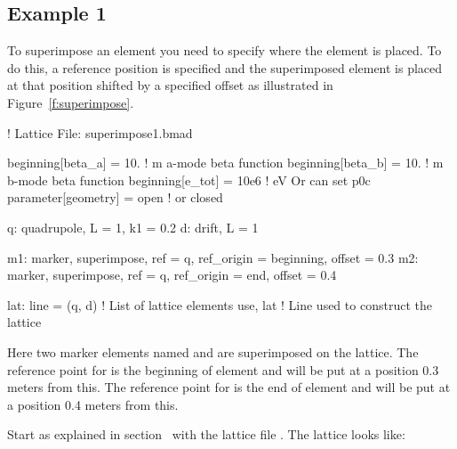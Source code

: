 \documentclass{hitec}
\begin{document}
\subsection{Example 1}

To superimpose an element you need to specify where the element is placed. To do this, a reference
position is specified and the superimposed element is placed at that position shifted by a specified
offset as illustrated in Figure~\ref{f:superimpose}.

\begin{code}
! Lattice File: superimpose1.bmad

beginning[beta_a] = 10.   ! m  a-mode beta function
beginning[beta_b] = 10.   ! m  b-mode beta function
beginning[e_tot] = 10e6   ! eV   Or can set p0c
parameter[geometry] = open      ! or closed

q: quadrupole, L = 1, k1 = 0.2
d: drift, L = 1

m1: marker, superimpose, ref = q, ref_origin = beginning, offset = 0.3
m2: marker, superimpose, ref = q, ref_origin = end, offset = 0.4

lat: line = (q, d)   ! List of lattice elements
use, lat             ! Line used to construct the lattice
\end{code}

Here two marker elements named  and  are superimposed on the lattice. The reference
point for  is the beginning of element  and  will be put at a position 0.3
meters from this.  The reference point for  is the end of element  and  will be
put at a position 0.4 meters from this.

Start \tao as explained in section~ with the lattice file
. The lattice looks like:

\end{document}
